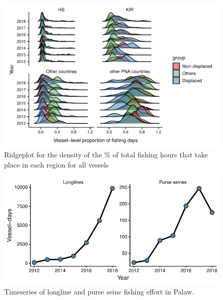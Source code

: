 \documentclass[12pt]{article}
\begin{document}
\begin{figure}
\centering
	\includegraphics{img/yearly_distribution_prop_fishing_by_region.pdf}
	\caption{\label{fig:yearly_distribution_prop_fishing_by_region}Ridgeplot for the density of the \% of total fishing hours that take place in each region for all vessels}	
\end{figure}

\clearpage

\begin{figure}
\centering
\includegraphics{img/PLW_GFW_ts.pdf}
\caption{\label{fig:PLW_GFW_ts}Timeseries of longline and purse seine fishing effort in Palaw.}
\end{figure}
\end{document}
